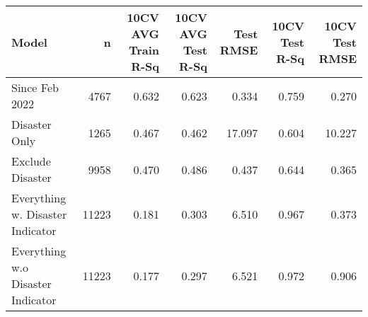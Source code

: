 
\begin{tabular}{l|r|r|r|r|r|r}
\hline
Model & n & 10CV AVG Train R-Sq & 10CV AVG Test R-Sq & Test RMSE & 10CV Test R-Sq & 10CV Test RMSE\\
\hline
Since Feb 2022 & 4767 & 0.632 & 0.623 & 0.334 & 0.759 & 0.270\\
\hline
Disaster Only & 1265 & 0.467 & 0.462 & 17.097 & 0.604 & 10.227\\
\hline
Exclude Disaster & 9958 & 0.470 & 0.486 & 0.437 & 0.644 & 0.365\\
\hline
Everything w. Disaster Indicator & 11223 & 0.181 & 0.303 & 6.510 & 0.967 & 0.373\\
\hline
Everything w.o Disaster Indicator & 11223 & 0.177 & 0.297 & 6.521 & 0.972 & 0.906\\
\hline
\end{tabular}

